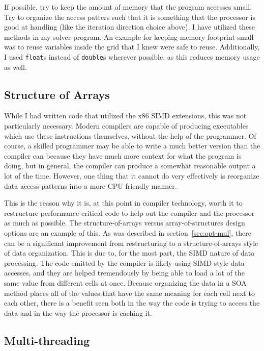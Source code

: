 If possible, try to keep the amount of memory that the program accesses small. Try to organize the access patters such that it is
something that the processor is good at handling (like the iteration direction choice above). I have utilized these methods in my
solver program. An example for keeping memory footprint small was to reuse variables inside the grid that I knew were safe to reuse.
Additionally, I used \texttt{float}s instead of \texttt{double}s wherever possible, as this reduces memory usage as well.

\subsection{Structure of Arrays}

While I had written code that utilized the x86 SIMD extensions, this was not particularly necessary. Modern compilers are capable
of producing executables which use these instructions themselves, without the help of the programmer. Of course, a skilled programmer
may be able to write a much better version than the compiler can because they have much more context for what the program is doing,
but in general, the compiler can produce a somewhat reasonable output a lot of the time. However, one thing that it cannot do very
effectively is reorganize data access patterns into a more CPU friendly manner.

This is the reason why it is, at this point in compiler technology, worth it to restructure performance critical code to help out
the compiler and the processor as much as possible. The structure-of-arrays versus array-of-structures design options are an example
of this. As was described in section~\ref{sec:opt-mul}, there can be a significant improvement from restructuring to a structure-of-arrays
style of data organization. This is due to, for the most part, the SIMD nature of data processing. The code emitted by the compiler
is likely using SIMD style data accesses, and they are helped tremendously by being able to load a lot of the same value from different
cells at once. Because organizing the data in a SOA method places all of the values that have the same meaning for each cell next to
each other, there is a benefit seen both in the way the code is trying to access the data and in the way the processor is caching it.

\subsection{Multi-threading}

